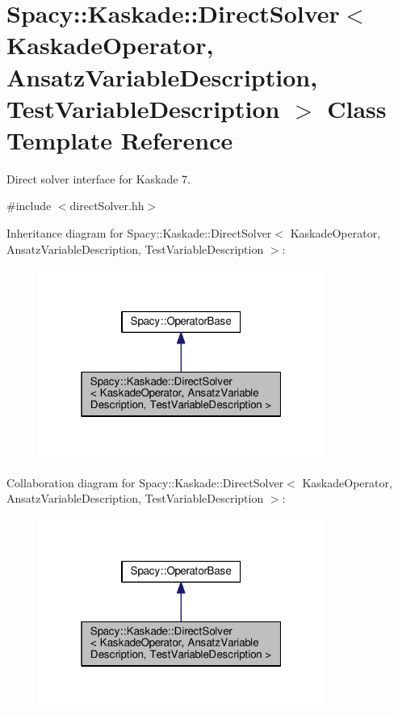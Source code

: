 \hypertarget{classSpacy_1_1Kaskade_1_1DirectSolver}{}\section{Spacy\+:\+:Kaskade\+:\+:Direct\+Solver$<$ Kaskade\+Operator, Ansatz\+Variable\+Description, Test\+Variable\+Description $>$ Class Template Reference}
\label{classSpacy_1_1Kaskade_1_1DirectSolver}


Direct solver interface for Kaskade 7.  




{\ttfamily \#include $<$direct\+Solver.\+hh$>$}



Inheritance diagram for Spacy\+:\+:Kaskade\+:\+:Direct\+Solver$<$ Kaskade\+Operator, Ansatz\+Variable\+Description, Test\+Variable\+Description $>$\+:\nopagebreak
\begin{figure}[H]
\begin{center}
\leavevmode
\includegraphics[width=265pt]{classSpacy_1_1Kaskade_1_1DirectSolver__inherit__graph}
\end{center}
\end{figure}


Collaboration diagram for Spacy\+:\+:Kaskade\+:\+:Direct\+Solver$<$ Kaskade\+Operator, Ansatz\+Variable\+Description, Test\+Variable\+Description $>$\+:\nopagebreak
\begin{figure}[H]
\begin{center}
\leavevmode
\includegraphics[width=265pt]{classSpacy_1_1Kaskade_1_1DirectSolver__coll__graph}
\end{center}
\end{figure}
